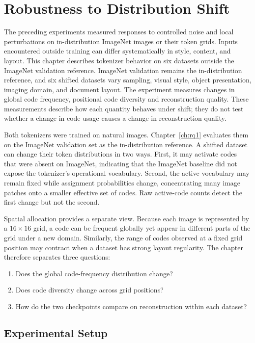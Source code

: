 \chapter{Robustness to Distribution Shift}
\label{ch:rq5}

The preceding experiments measured responses to controlled noise and local
perturbations on in-distribution ImageNet images or their token grids. Inputs
encountered outside training can differ systematically in style, content, and
layout. This chapter describes tokenizer behavior on six datasets outside
the ImageNet validation reference.
ImageNet validation remains the in-distribution reference, and six shifted
datasets vary sampling, visual style, object presentation, imaging domain, and
document layout. The experiment measures changes in global code frequency,
positional code diversity and reconstruction quality. These measurements
describe how each quantity behaves under shift; they do not test whether a
change in code usage causes a change in reconstruction quality.

Both tokenizers were trained on natural images. Chapter~\ref{ch:rq1} evaluates
them on the ImageNet validation set as the in-distribution reference. A shifted dataset can change their token
distributions in two ways. First, it may activate codes that were absent on
ImageNet, indicating that the ImageNet baseline did not expose the tokenizer's
operational vocabulary. Second, the
active vocabulary may remain fixed while assignment probabilities change,
concentrating many image patches onto a smaller effective set of codes. Raw
active-code counts detect the first change but not the second.

Spatial allocation provides a separate view. Because each image is represented
by a $16\times16$ grid, a code can be frequent globally yet appear in different
parts of the grid under a new domain. Similarly, the range of codes observed at
a fixed grid position may contract when a dataset has strong layout regularity.
The chapter therefore separates three questions:
\begin{enumerate}
    \item Does the global code-frequency distribution change?
    \item Does code diversity change across grid positions?
    \item How do the two checkpoints compare on reconstruction within each dataset?
\end{enumerate}

\section{Experimental Setup}
\label{sec:rq5_setup}

